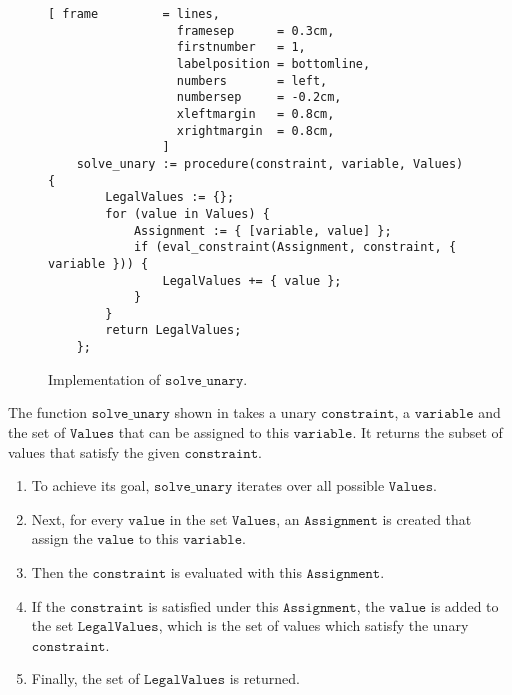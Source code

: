 \begin{figure}[!ht]
\centering
\begin{Verbatim}[ frame         = lines, 
                  framesep      = 0.3cm, 
                  firstnumber   = 1,
                  labelposition = bottomline,
                  numbers       = left,
                  numbersep     = -0.2cm,
                  xleftmargin   = 0.8cm,
                  xrightmargin  = 0.8cm,
                ]
    solve_unary := procedure(constraint, variable, Values) {
        LegalValues := {};
        for (value in Values) {
            Assignment := { [variable, value] };
            if (eval_constraint(Assignment, constraint, { variable })) {
                LegalValues += { value };
            }
        }
        return LegalValues;
    };
\end{Verbatim}
\vspace*{-0.3cm}
\caption{Implementation of $\mathtt{solve\_unary}$.}
\label{fig:csp-constraint-propagation.stlx:solve_unary}
\end{figure}

The function $\mathtt{solve\_unary}$ shown in  takes a unary
$\mathtt{constraint}$, a $\mathtt{variable}$ and the set of $\mathtt{Values}$ that can be assigned to this
$\mathtt{variable}$.  It returns the subset of values that satisfy the given $\mathtt{constraint}$.
\begin{enumerate}
\item To achieve its goal, $\mathtt{solve\_unary}$ iterates over all possible $\mathtt{Values}$.  
\item Next, for every $\mathtt{value}$ in the set $\mathtt{Values}$, an $\mathtt{Assignment}$ is created that assign
      the $\mathtt{value}$ to this $\mathtt{variable}$.
\item Then the $\mathtt{constraint}$ is evaluated with this $\mathtt{Assignment}$.
\item If the $\mathtt{constraint}$ is satisfied under this $\mathtt{Assignment}$, the $\mathtt{value}$ is added to the set
      $\mathtt{LegalValues}$, which is the set of values which satisfy the unary $\mathtt{constraint}$.
\item Finally, the set of $\mathtt{LegalValues}$ is returned.
\end{enumerate}

